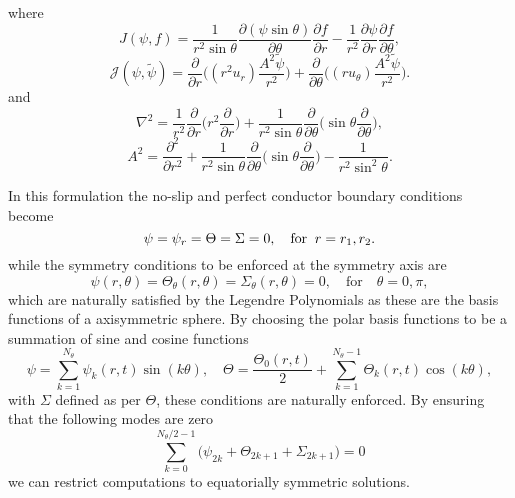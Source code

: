 \documentclass[a4paper]{article}
\begin{document}
\noindent where
\begin{equation}
J(\psi,f) = \frac{1}{r^2 \sin \theta} \frac{\partial (\psi \sin \theta) }{\partial  \theta} \frac{\partial f }{\partial  r} - \frac{1}{r^2} \frac{\partial \psi}{\partial r} \frac{\partial f }{\partial  \theta},
\end{equation}
\begin{equation}
\mathcal{J}( \psi, \tilde{\psi}) = \frac{\partial }{\partial r} \bigg( ( r^2 u_r) \frac{A^2 \tilde{\psi}}{r^2} \bigg) + \frac{ \partial }{\partial \theta} \bigg( (r u_{\theta}) \frac{A^2 \tilde{\psi}}{r^2} \bigg).
\end{equation}
and
\begin{equation}
\nabla^2 = \frac{1}{r^2} \frac{\partial }{\partial r} \bigg( r^2 \frac{\partial }{\partial r} \bigg) + \frac{1}{r^2 \sin \theta} \frac{\partial}{\partial \theta} \bigg(\sin \theta \frac{\partial }{\partial \theta} \bigg), 
\end{equation}
\begin{equation}
A^2 = \frac{\partial^2 }{\partial r^2} + \frac{1}{r^2 \sin \theta} \frac{\partial}{\partial \theta}\bigg(\sin \theta \frac{\partial }{\partial \theta} \bigg) - \frac{1}{r^2 \sin^2 \theta}.
\end{equation}

\noindent In this formulation the no-slip and perfect conductor boundary conditions become
\begin{equation}
 \psi = \psi_r = \Theta= \Sigma = 0, \quad \hbox{for} \; \; r = r_1,r_2. 
\label{eq:bcs_App}
\end{equation}
while the symmetry conditions to be enforced at the symmetry axis are
\begin{equation} 
\psi(r, \theta) = \Theta_{\theta}(r, \theta) = \Sigma_{\theta}(r,\theta)=0, \quad \text{for} \quad \theta = 0,\pi, 
\end{equation}
\noindent which are naturally satisfied by the Legendre Polynomials as these are the basis functions of a axisymmetric sphere. By choosing the polar basis functions to be a summation of sine and cosine functions 
\begin{equation}
\psi = \sum_{k=1}^{N_{\theta}} \psi_k(r,t) \sin ( k \theta ), \quad \Theta = \frac{\Theta_0(r,t)}{2} + \sum_{k=1}^{N_{\theta}-1} \Theta_k(r,t) \cos ( k \theta ),
\label{eq:Sine_Cosine_Basis}
\end{equation}
with $\Sigma$ defined as per $\Theta$, these conditions are naturally enforced. By ensuring that the following modes are zero
\begin{equation}
    \sum_{k=0}^{N_{\theta}/2 - 1} \big( \psi_{2k} + \Theta_{2k+1} + \Sigma_{2k+1} \big) = 0 
\end{equation}
we can restrict computations to equatorially symmetric solutions. 
\end{document}

